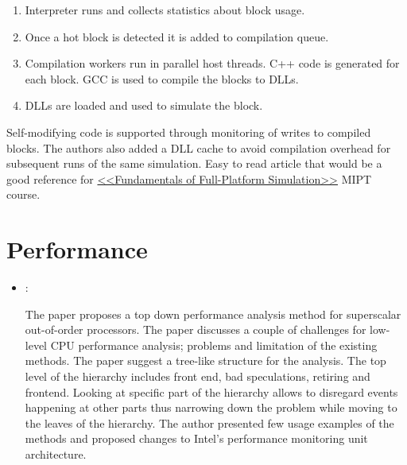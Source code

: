 \begin{itemize}
    \begin{enumerate}
        \item Interpreter runs and collects statistics about block usage.
        \item Once a hot block is detected it is added to compilation queue.
        \item Compilation workers run in parallel host threads. C++ code is generated for each block. GCC is used to compile the blocks to DLLs.
        \item DLLs are loaded and used to simulate the block.
    \end{enumerate}

    Self-modifying code is supported through monitoring of writes to compiled blocks. The authors also added a DLL cache to avoid compilation overhead for subsequent runs of the same simulation. Easy to read article that would be a good reference for \href{https://github.com/yulyugin/sim-lectures}{<<Fundamentals of Full-Platform Simulation>>} MIPT course.
\end{itemize}

\section*{Performance}
\begin{itemize}
    \item \cite{Yasin:TopDownCPUPerfAnalysis:2014}:

    The paper proposes a top down performance analysis method for superscalar out-of-order processors. The paper discusses a couple of challenges for low-level CPU performance analysis; problems and limitation of the existing methods. The paper suggest a tree-like structure for the analysis. The top level of the hierarchy includes front end, bad speculations, retiring and frontend. Looking at specific part of the hierarchy allows to disregard events happening at other parts thus narrowing down the problem while moving to the leaves of the hierarchy. The author presented few usage examples of the methods and proposed changes to Intel's performance monitoring unit architecture.
\end{itemize}

